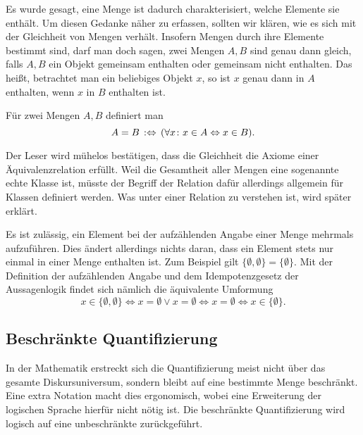 Es wurde gesagt, eine Menge ist dadurch charakterisiert, welche
Elemente sie enthält. Um diesen Gedanke näher zu erfassen, sollten
wir klären, wie es sich mit der Gleichheit von Mengen verhält.
Insofern Mengen durch ihre Elemente bestimmt sind, darf man doch sagen,
zwei Mengen $A,B$ sind genau dann gleich, falls $A,B$ ein Objekt
gemeinsam enthalten oder gemeinsam nicht enthalten. Das heißt, betrachtet
man ein beliebiges Objekt $x$, so ist $x$ genau dann in $A$ enthalten,
wenn $x$ in $B$ enthalten ist.
\begin{Definition}\label{def:Mengen-Gleichheit}%
\newlinefirst
Für zwei Mengen $A,B$ definiert man
\[A = B\,:\Leftrightarrow\, (\forall x\colon x\in A\Leftrightarrow x\in B).\]
\end{Definition}
Der Leser wird mühelos bestätigen, dass die Gleichheit die Axiome
einer Äquivalenzrelation erfüllt. Weil die Gesamtheit aller Mengen eine
sogenannte echte Klasse ist, müsste der Begriff der Relation dafür
allerdings allgemein für Klassen definiert werden. Was unter einer
Relation zu verstehen ist, wird später erklärt.

Es ist zulässig, ein Element bei der aufzählenden Angabe einer Menge
mehrmals aufzuführen. Dies ändert allerdings nichts daran, dass ein
Element stets nur einmal in einer Menge enthalten ist. Zum Beispiel
gilt $\{\emptyset,\emptyset\}=\{\emptyset\}$. Mit der Definition der
aufzählenden Angabe und dem Idempotenzgesetz
der Aussagenlogik findet sich nämlich die äquivalente Umformung%
\[x\in\{\emptyset,\emptyset\}\iff x=\emptyset\lor x=\emptyset
\iff x=\emptyset\iff x\in\{\emptyset\}.\]

\subsection{Beschränkte Quantifizierung}

In der Mathematik erstreckt sich die Quantifizierung meist nicht
über das gesamte Diskursuniversum, sondern bleibt auf eine bestimmte
Menge beschränkt. Eine extra Notation macht dies ergonomisch, wobei
eine Erweiterung der logischen Sprache hierfür nicht nötig ist. Die
beschränkte Quantifizierung wird logisch auf eine unbeschränkte
zurückgeführt.

